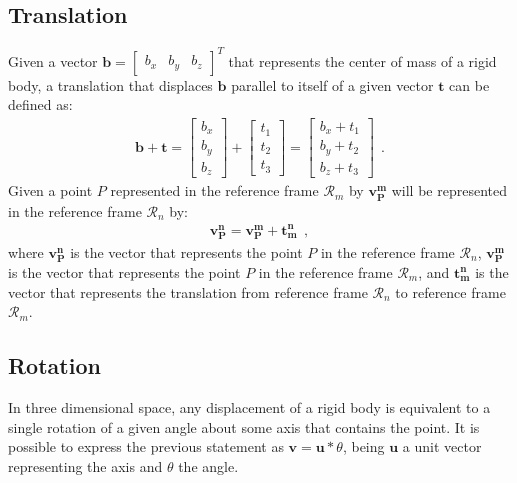 \subsection{Translation}
\label{subsec:chapter1:transform:translation}
Given a vector $\bm{b} = \begin{bmatrix}b_x & b_y & b_z\end{bmatrix}^T$ that represents the center of mass of a rigid body, a translation that displaces $\bm{b}$ parallel to itself of a given vector $\bm{t}$ can be defined as:
\begin{align*}
    \bm{b} + \bm{t} = \begin{bmatrix}
        b_x \\ b_y \\ b_z
    \end{bmatrix} + \begin{bmatrix}
    t_1 \\ t_2 \\ t_3
\end{bmatrix} = \begin{bmatrix}
        b_x + t_1\\ b_y + t_2 \\ b_z + t_3
\end{bmatrix}~~.
\end{align*}
Given a point $P$ represented in the reference frame $\mathcal{R}_m$ by $\bm{v_P^m}$ will be represented in the reference frame $\mathcal{R}_n$ by:
\begin{align*}
    \bm{v_P^n} = \bm{v_P^m} + \bm{t_m^n}~~,
\end{align*}
where $\bm{v_P^n}$ is the vector that represents the point $P$ in the reference frame $\mathcal{R}_n$, $\bm{v_P^m}$ is the vector that represents the point $P$ in the reference frame $\mathcal{R}_m$, and $\bm{t_m^n}$ is the vector that represents the translation from reference frame $\mathcal{R}_n$ to reference frame $\mathcal{R}_m$.

\subsection{Rotation}
\label{subsec:chapter1:transform:rotation}
In three dimensional space, any displacement of a rigid body is equivalent to a single rotation of a given angle about some axis that contains the point. It is possible to express the previous statement as $\bm{v} = \bm{u} * \theta$, being $\bm{u}$ a unit vector representing the axis and $\theta$ the angle.\\

